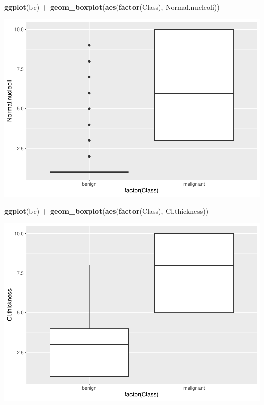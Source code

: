 \documentclass[
]{book}
\newenvironment{Shaded}{\begin{snugshade}}{\end{snugshade}}
\newcommand{\FunctionTok}[1]{\textcolor[rgb]{0.13,0.29,0.53}{\textbf{#1}}}
\newcommand{\NormalTok}[1]{#1}
\newcommand{\SpecialCharTok}[1]{\textcolor[rgb]{0.81,0.36,0.00}{\textbf{#1}}}
\begin{document}
\begin{Shaded}
\begin{Highlighting}[]
\FunctionTok{ggplot}\NormalTok{(bc) }\SpecialCharTok{+} \FunctionTok{geom\_boxplot}\NormalTok{(}\FunctionTok{aes}\NormalTok{(}\FunctionTok{factor}\NormalTok{(Class), Normal.nucleoli))}
\end{Highlighting}
\end{Shaded}

\includegraphics{_main_files/figure-latex/unnamed-chunk-82-1.pdf}

\begin{Shaded}
\begin{Highlighting}[]
\FunctionTok{ggplot}\NormalTok{(bc) }\SpecialCharTok{+} \FunctionTok{geom\_boxplot}\NormalTok{(}\FunctionTok{aes}\NormalTok{(}\FunctionTok{factor}\NormalTok{(Class), Cl.thickness))}
\end{Highlighting}
\end{Shaded}

\includegraphics{_main_files/figure-latex/unnamed-chunk-83-1.pdf}
\end{document}
